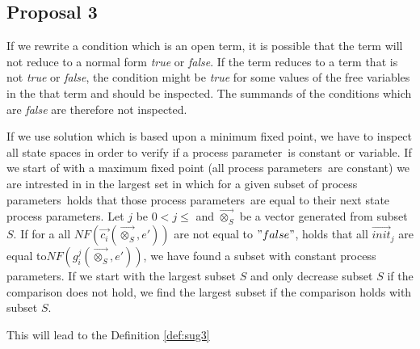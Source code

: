 \documentclass[a4paper,10pt]{article}
\newcommand{\ovr}{\overrightarrow}
\newcommand{\pp}{process parameter}
\newcommand{\pps}{process parameters}
\newcommand{\ti}{\textit}
\begin{document}
\subsection{Proposal 3}
If we rewrite a condition which is an open term, it is possible
that the term will not reduce to a normal form \ti{true} or \ti{false}. If the term reduces to a
term that is not \ti{true} or \ti{false}, the condition might be \ti{true} for some values of the free variables in the that term and should be inspected. The summands of the conditions which are \ti{false} are therefore not inspected.
 
If we use solution which is based upon a minimum fixed point, we have to inspect all state spaces in order to verify if a \pp\ is constant or variable. If we start of with a maximum fixed point (all \pps\ are constant) we are intrested in in the largest set in which for a given subset of \pps\ holds that those \pps\ are equal to their next state \pps . Let $j$ be $0 < j \leqslant $ and $\ovr{\otimes_S}$ be a vector generated from subset $S$. If for a all $NF(\ovr{c_i}(\ovr{\otimes_S},e'))$ are not equal to $"false"$, holds that all $\ovr{init}_j$ are equal to$ NF(g_i^j(\ovr{\otimes_S},e'))$, we have found a subset with constant \pps . If we start with the largest subset $S$ and only decrease subset $S$ if the comparison does not hold, we find the largest subset if the comparison holds with subset $S$.
 
This will lead to the Definition \ref{def:sug3} 
\end{document}
